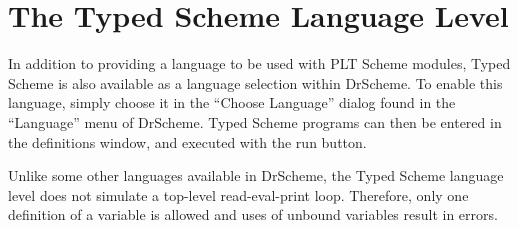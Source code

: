 \documentclass{book}
\begin{document}
\chapter{The \textrm{Typed Scheme} Language Level}

In addition to providing a language to be used with PLT Scheme
modules, Typed Scheme is also available as a language selection within
DrScheme.  To enable this language, simply choose it in the ``Choose
Language'' dialog found in the ``Language'' menu of DrScheme.  Typed
Scheme programs can then be entered in the definitions window, and
executed with the run button.  

Unlike some other languages available in DrScheme, the Typed Scheme
language level does not simulate a top-level read-eval-print loop.
Therefore, only one definition of a variable is allowed and uses of
unbound variables result in errors.
\end{document}
